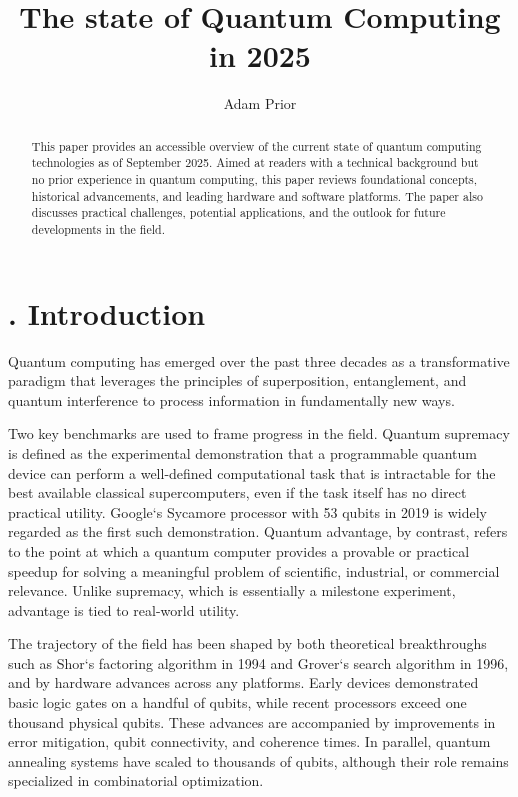 \documentclass{elbioimp2}
\title{The state of Quantum Computing in 2025}
\author{Adam Prior\affiliation{UrbanFox, Dublin, Ireland}}
\begin{document}
\setcounter{secnumdepth}{2}


\maketitle

\begin{abstract}
This paper provides an accessible overview of the current state of quantum computing technologies as of September 2025. Aimed at readers with a technical background but no prior experience in quantum computing, this paper reviews foundational concepts, historical advancements, and leading hardware and software platforms. The paper also discusses practical challenges, potential applications, and the outlook for future developments in the field.
\end{abstract}

\section{. Introduction}
Quantum computing has emerged over the past three decades as a transformative paradigm that
leverages the principles of superposition, entanglement, and quantum interference to process
information in fundamentally new ways. 

Two key benchmarks are used to frame progress in the field. Quantum supremacy is defined as
the experimental demonstration that a programmable quantum device can perform a well-defined
computational task that is intractable for the best available classical supercomputers, even
if the task itself has no direct practical utility. Google`s Sycamore processor with 53 qubits
in 2019 is widely regarded as the first such demonstration. Quantum advantage, by contrast, refers
to the point at which a quantum computer provides a provable or practical speedup for solving a
meaningful problem of scientific, industrial, or commercial relevance. Unlike supremacy, which
is essentially a milestone experiment, advantage is tied to real-world utility.

The trajectory of the field has been shaped by both theoretical breakthroughs such as Shor`s
factoring algorithm in 1994 and Grover`s search algorithm in 1996, and by hardware advances
across any platforms. Early devices demonstrated basic logic gates on a handful of qubits, while recent
processors exceed one thousand physical qubits. These advances are accompanied by improvements
in error mitigation, qubit connectivity, and coherence times. In parallel, quantum annealing systems
have scaled to thousands of qubits, although their role remains specialized in combinatorial
optimization.
\end{document}
